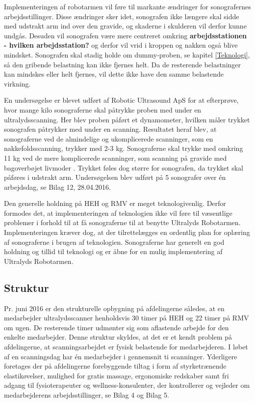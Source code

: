 Implementeringen af robotarmen vil føre til markante ændringer for sonografernes arbejdsstillinger. Disse ændringer sker idet, sonografen ikke længere skal sidde med udstrakt arm ind over den gravide, og skaderne i skulderen vil derfor kunne undgås. Desuden vil sonografen være mere centreret omkring \textbf{arbejdsstationen - hvilken arbejdsstation?} og derfor vil vrid i kroppen og nakken også blive mindsket. Sonografen skal stadig holde om dummy-proben, se kapitel \ref{Teknologi}, så den gribende belastning kan ikke fjernes helt. Da de resterende belastninger kan mindskes eller helt fjernes, vil dette ikke have den samme belastende virkning. 

En undersøgelse er blevet udført af Robotic Ultrasound ApS for at efterprøve, hvor mange kilo sonograferne skal påtrykke proben med under en ultralydsscanning. Her blev proben påført et dynamometer, hvilken måler trykket sonografen påtrykker med under en scanning. Resultatet heraf blev, at sonograferne ved de almindelige og ukomplicerede scanninger, som en nakkefoldsscanning, trykker med 2-3 kg. Sonograferne skal trykke med omkring 11 kg ved de mere komplicerede scanninger, som scanning på gravide med bagoverbøjet livmoder \cite{livmoder}. Trykket føles dog større for sonografen, da trykket skal påføres i udstrakt arm. Undersøgelsen blev udført på 5 sonografer over én arbejdsdag, se Bilag 12, 28.04.2016.

Den generelle holdning på HEH og RMV er meget teknologivenlig. Derfor formodes det, at implementeringen af teknologien ikke vil føre til væsentlige problemer i forhold til at få sonograferne til at benytte Ultralyds Robotarmen. Implementeringen kræver dog, at der tilrettelægges en ordentlig plan for oplæring af sonograferne i brugen af teknologien. Sonograferne har generelt en god holdning og tillid til teknologi og er åbne for en mulig implementering af Ultralyds Robotarmen.

\subsection{Struktur}
Pr. juni 2016 er den strukturelle opbygning på afdelingerne således, at en medarbejder ultralydsscanner henholdsvis 30 timer på HEH og 22 timer på RMV om ugen. De resterende timer udmønter sig som aflastende arbejde for den enkelte medarbejder. Denne struktur skyldes, at det er et kendt problem på afdelingerne, at scanningsarbejdet er fysisk belastende for medarbejderen. I løbet af en scanningsdag har én medarbejder i gennemsnit ti scanninger. Yderligere foretages der på afdelingerne forebyggende tiltag i form af styrketrænende elastikøvelser, mulighed for gratis massage, ergonomiske redskaber samt fri adgang til fysioterapeuter og wellness-konsulenter, der kontrollerer og vejleder om medarbejderens arbejdsstillinger, se Bilag 4 og Bilag 5.

